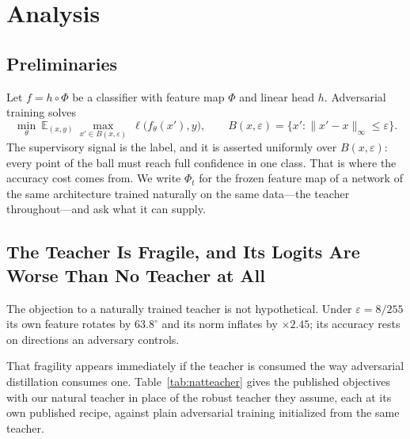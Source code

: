 
\section{Analysis}
\label{sec:analysis}

\subsection{Preliminaries}

Let $f=h\circ\Phi$ be a classifier with feature map $\Phi$ and linear head $h$. Adversarial training
\citep{madry2018towards} solves
\begin{equation}
\min_\theta\ \mathbb{E}_{(x,y)}\ \max_{x'\in B(x,\varepsilon)}\ \ell\big(f_\theta(x'),y\big),
\qquad B(x,\varepsilon)=\{x':\lVert x'-x\rVert_\infty\le\varepsilon\}.
\label{eq:at}
\end{equation}
The supervisory signal is the label, and it is asserted uniformly over $B(x,\varepsilon)$: every point
of the ball must reach full confidence in one class. That is where the accuracy cost comes from.
We write $\Phi_t$ for the frozen feature map of a network of the same architecture trained naturally on
the same data---the teacher throughout---and ask what it can supply.

\subsection{The Teacher Is Fragile, and Its Logits Are Worse Than No Teacher at All}
\label{sec:fragile}

The objection to a naturally trained teacher is not hypothetical. Under $\varepsilon=8/255$ its own
feature rotates by $63.8^\circ$ and its norm inflates by $\times2.45$; its accuracy rests on
directions an adversary controls.

That fragility appears immediately if the teacher is consumed the way adversarial distillation
consumes one. Table~\ref{tab:natteacher} gives the published objectives with our natural teacher in
place of the robust teacher they assume, each at its own published recipe, against plain adversarial
training initialized from the same teacher.

